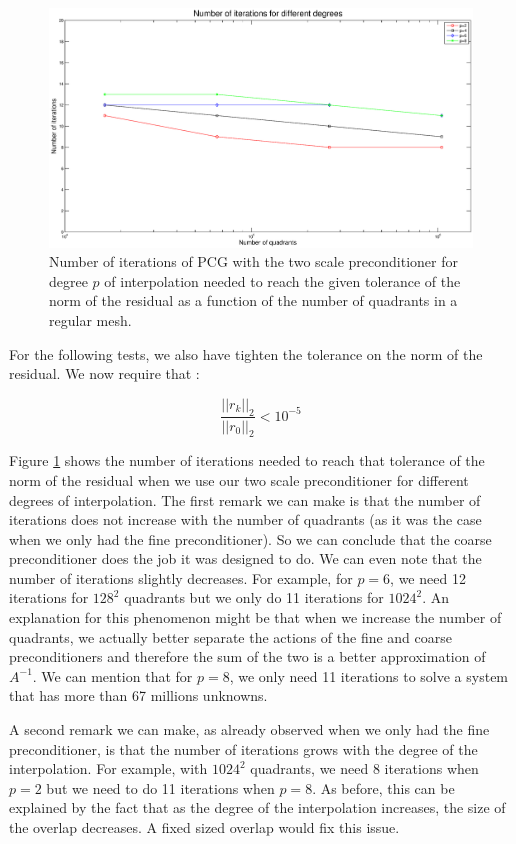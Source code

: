 \begin{figure}
\centering
\includegraphics[scale=0.35]{Results/two_reg_iter.eps}
\caption{Number of iterations of PCG with the two scale preconditioner for degree $p$ of interpolation needed to reach the given tolerance of the norm of the residual as a function of the number of quadrants in a regular mesh.}
\label{two_reg_iter}
\end{figure}

For the following tests, we also have tighten the tolerance on the norm of the residual. We now require that : 

$$\frac{||r_k||_2}{||r_0||_2} < 10^{-5}$$

Figure \ref{two_reg_iter} shows the number of iterations needed to reach that tolerance of the norm of the residual when we use our two scale preconditioner for different degrees of interpolation. The first remark we can make is that the number of iterations does not increase with the number of quadrants (as it was the case when we only had the fine preconditioner). So we can conclude that the coarse preconditioner does the job it was designed to do. We can even note that the number of iterations slightly decreases. For example, for $p=6$, we need 12 iterations for $128^2$ quadrants but we only do 11 iterations for $1024^2$. An explanation for this phenomenon might be that when we increase the number of quadrants, we actually better separate the actions of the fine and coarse preconditioners and therefore the sum of the two is a better approximation of $A^{-1}$. We can mention that for $p=8$, we only need 11 iterations to solve a system that has more than 67 millions unknowns. 

A second remark we can make, as already observed when we only had the fine preconditioner, is that the number of iterations grows with the degree of the interpolation. For example, with $1024^2$ quadrants, we need 8 iterations when $p=2$ but we need to do 11 iterations when $p=8$. As before, this can be explained by the fact that as the degree of the interpolation increases, the size of the overlap decreases. A fixed sized overlap would fix this issue. 

